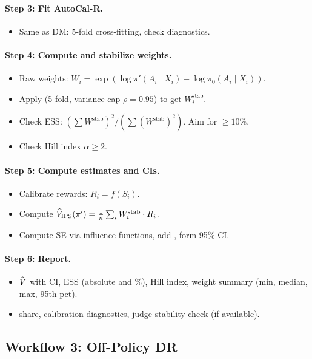 \paragraph{Step 3: Fit AutoCal-R.}
\begin{itemize}
\item Same as DM: 5-fold cross-fitting, check diagnostics.
\end{itemize}

\paragraph{Step 4: Compute and stabilize weights.}
\begin{itemize}
\item Raw weights: $W_i = \exp(\log \pi'(A_i \mid X_i) - \log \pi_0(A_i \mid X_i))$.
\item Apply \simcal{} (5-fold, variance cap $\rho = 0.95$) to get $W_i^{\text{stab}}$.
\item Check ESS: $({\textstyle\sum} W^{\text{stab}})^2 / ({\textstyle\sum} (W^{\text{stab}})^2)$. Aim for $\ge 10\%$.
\item Check Hill index $\alpha \ge 2$.
\end{itemize}

\paragraph{Step 5: Compute estimates and CIs.}
\begin{itemize}
\item Calibrate rewards: $R_i = f(S_i)$.
\item Compute $\widehat{V}_{\text{IPS}}(\pi') = \frac{1}{n} \sum_i W_i^{\text{stab}} \cdot R_i$.
\item Compute SE via influence functions, add \oua, form 95\% CI.
\end{itemize}

\paragraph{Step 6: Report.}
\begin{itemize}
\item $\widehat{V}$ with CI, ESS (absolute and \%), Hill index, weight summary (min, median, max, 95th pct).
\item \oua{} share, calibration diagnostics, judge stability check (if available).
\end{itemize}

\subsection{Workflow 3: Off-Policy DR}


